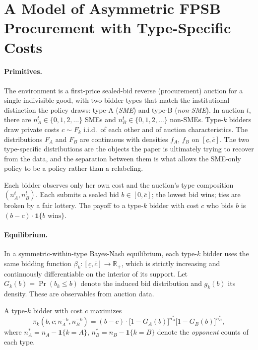 \documentclass[12pt]{article}
\begin{document}
\section{A Model of Asymmetric FPSB Procurement with Type-Specific Costs}
\label{sec:model}

\paragraph{Primitives.}
The environment is a first-price sealed-bid reverse (procurement)
auction for a single indivisible good, with two bidder types that
match the institutional distinction the policy draws: type-A
(\emph{SME}) and type-B (\emph{non-SME}). In auction $t$, there are
$n_A^t \in \{0, 1, 2, \ldots\}$ SMEs and $n_B^t \in \{0, 1, 2,
\ldots\}$ non-SMEs. Type-$k$ bidders draw private costs $c \sim F_k$
i.i.d.\ of each other and of auction characteristics. The
distributions $F_A$ and $F_B$ are continuous with densities $f_A$,
$f_B$ on $[\underline{c}, \overline{c}]$. The two type-specific
distributions are the objects the paper is ultimately trying to
recover from the data, and the separation between them is what
allows the SME-only policy to be a policy rather than a
relabeling.

Each bidder observes only her own cost and the auction's type
composition $(n_A^t, n_B^t)$. Each submits a sealed bid
$b \in [0, \overline{c}]$; the lowest bid wins; ties are broken by a
fair lottery. The payoff to a type-$k$ bidder with cost $c$ who bids
$b$ is $(b - c) \cdot \mathbf{1}\{b \text{ wins}\}$.

\paragraph{Equilibrium.}
In a symmetric-within-type Bayes-Nash equilibrium, each type-$k$ bidder
uses the same bidding function $\beta_k: [\underline{c}, \overline{c}]
\to \mathbb{R}_+$, which is strictly increasing and continuously
differentiable on the interior of its support. Let $G_k(b) = \Pr(b_k \le b)$
denote the induced bid distribution and $g_k(b)$ its density. These
are observables from auction data.

A type-$k$ bidder with cost $c$ maximizes
\[
\pi_k(b, c; n_A^{-k}, n_B^{-k})
= (b - c) \cdot
  \bigl[1 - G_A(b)\bigr]^{n_A^*}
  \bigl[1 - G_B(b)\bigr]^{n_B^*},
\]
where $n_A^* = n_A - \mathbf{1}\{k = A\}$, $n_B^* = n_B - \mathbf{1}\{k = B\}$
denote the \emph{opponent} counts of each type.
\end{document}
